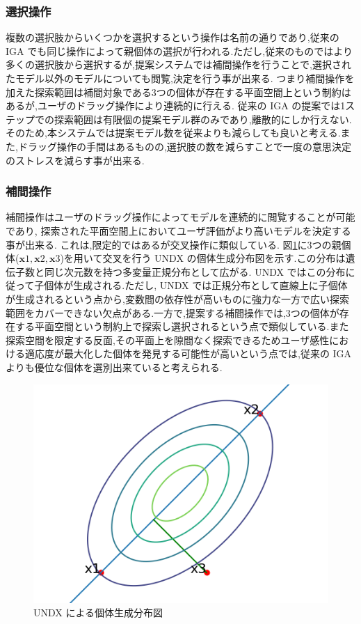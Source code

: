 \subsubsection{選択操作}
複数の選択肢からいくつかを選択するという操作は名前の通りであり,従来の IGA でも同じ操作によって親個体の選択が行われる.ただし,従来のものではより多くの選択肢から選択するが,提案システムでは補間操作を行うことで,選択されたモデル以外のモデルについても閲覧,決定を行う事が出来る.
つまり補間操作を加えた探索範囲は補間対象である3つの個体が存在する平面空間上という制約はあるが,ユーザのドラッグ操作により連続的に行える.
従来の IGA の提案では1ステップでの探索範囲は有限個の提案モデル群のみであり,離散的にしか行えない.
そのため,本システムでは提案モデル数を従来よりも減らしても良いと考える.また,ドラッグ操作の手間はあるものの,選択肢の数を減らすことで一度の意思決定のストレスを減らす事が出来る.

\subsubsection{補間操作}
補間操作はユーザのドラッグ操作によってモデルを連続的に閲覧することが可能であり,
探索された平面空間上においてユーザ評価がより高いモデルを決定する事が出来る.
これは,限定的ではあるが交叉操作に類似している.
図\ref{fig:UNDX}に3つの親個体($\bm{x}1,\bm{x}2,\bm{x}3$)を用いて交叉を行う UNDX の個体生成分布図を示す.この分布は遺伝子数と同じ次元数を持つ多変量正規分布として広がる. UNDX ではこの分布に従って子個体が生成される.ただし, UNDX では正規分布として直線上に子個体が生成されるという点から,変数間の依存性が高いものに強力な一方で広い探索範囲をカバーできない欠点がある.一方で,提案する補間操作では,3つの個体が存在する平面空間という制約上で探索し選択されるという点で類似している.また探索空間を限定する反面,その平面上を隙間なく探索できるためユーザ感性における適応度が最大化した個体を発見する可能性が高いという点では,従来の IGA よりも優位な個体を選別出来ていると考えられる.

\begin{figure}[h]
	\begin{center}
		\includegraphics[scale=0.7]{./imgs/UNDX.png}
		\caption[UNDX による個体生成分布図]{ UNDX による個体生成分布図\label{fig:UNDX}}
	\end{center}
\end{figure}


